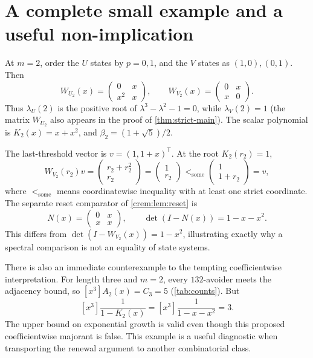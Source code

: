 \documentclass[11pt,a4paper]{article}
\theoremstyle{definition}\newaliascnt{definition}{theorem}
\theoremstyle{remark}\newaliascnt{remark}{theorem}
\begin{document}
\section{A complete small example and a useful non-implication}
\label{crem:sec:m2}
At $m=2$, order the $U$ states by $p=0,1$, and the $V$ states as
$(1,0),(0,1)$. Then
\[
 W_{U_2}(x)=\begin{pmatrix}0&x\\x^2&x\end{pmatrix},
 \qquad
 W_{V_2}(x)=\begin{pmatrix}0&x\\x&0\end{pmatrix}.
\]
Thus $\lambda_U(2)$ is the positive root of $\lambda^3-\lambda^2-1=0$, while
$\lambda_V(2)=1$ (the matrix $W_{U_2}$ also appears in the proof of
\cref{thm:strict-main}). The scalar polynomial is $K_2(x)=x+x^2$, and
$\beta_2=(1+\sqrt5)/2$.

The last-threshold vector is $v=(1,1+x)^{\mathsf T}$. At the root
$K_2(r_2)=1$,
\[
 W_{V_2}(r_2)v=
 \begin{pmatrix}r_2+r_2^2\\r_2\end{pmatrix}
 =\begin{pmatrix}1\\r_2\end{pmatrix}
 <_{\mathrm{some}}\begin{pmatrix}1\\1+r_2\end{pmatrix}=v,
\]
where $<_{\mathrm{some}}$ means coordinatewise inequality with at least one
strict coordinate. The separate reset comparator of \cref{crem:lem:reset} is
\[
 N(x)=\begin{pmatrix}0&x\\x&x\end{pmatrix},
 \qquad \det(I-N(x))=1-x-x^2.
\]
This differs from $\det(I-W_{V_2}(x))=1-x^2$, illustrating exactly why a
spectral comparison is not an equality of state systems.

There is also an immediate counterexample to the tempting coefficientwise
interpretation. For length three and $m=2$, every $132$-avoider meets the
adjacency bound, so $[x^3]A_2(x)=C_3=5$ (\cref{tab:counts}). But
\[
 [x^3]\frac1{1-K_2(x)}
 =[x^3]\frac1{1-x-x^2}=3.
\]
The upper bound on exponential growth is valid even though this proposed
coefficientwise majorant is false. This example is a useful diagnostic when
transporting the renewal argument to another combinatorial class.
\end{document}
